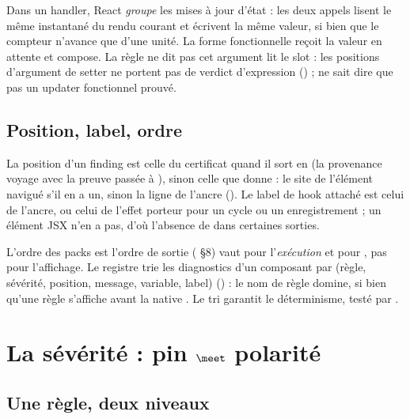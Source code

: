 \begin{react}
Dans un handler, React \emph{groupe} les mises à jour d'état : les deux appels  lisent le même instantané  du rendu courant et écrivent la même valeur, si bien que le compteur n'avance que d'une unité. La forme fonctionnelle  reçoit la valeur en attente et compose. La règle ne dit pas \og cet argument lit le slot\fg{} : les positions d'argument de setter ne portent pas de verdict d'expression () ;  ne sait dire que \og pas un updater fonctionnel prouvé\fg{}.
\end{react}

\subsection{Position, label, ordre}

La position d'un finding est celle du certificat quand il sort en \Error{} (la provenance \og voyage\fg{} avec la preuve passée à ), sinon celle que donne  : le site de l'élément navigué s'il en a un, sinon la ligne de l'ancre (). Le label de hook attaché est celui de l'ancre, ou celui de l'effet porteur pour un cycle ou un enregistrement ; un élément JSX n'en a pas, d'où l'absence de \code{[hook:N]} dans certaines sorties.

\begin{piege}
\og L'ordre des packs est l'ordre de sortie\fg{} ( §8) vaut pour l'\emph{exécution} et pour , pas pour l'affichage. Le registre trie les diagnostics d'un composant par (règle, sévérité, position, message, variable, label) () : le nom de règle domine, si bien qu'une règle  s'affiche avant la native . Le tri garantit le déterminisme, testé par .
\end{piege}

\section{La sévérité : pin \texorpdfstring{$\meet$}{meet} polarité}
\label{sec:regles-declaratives-severite}

\subsection{Une règle, deux niveaux}

